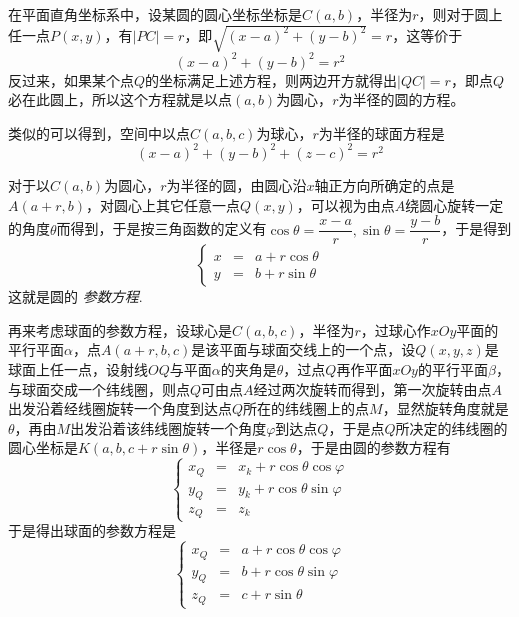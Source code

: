 在平面直角坐标系中，设某圆的圆心坐标坐标是$C(a,b)$，半径为$r$，则对于圆上任一点$P(x,y)$，有$|PC|=r$，即$\sqrt{(x-a)^2+(y-b)^2}=r$，这等价于
\[ (x-a)^2+(y-b)^2=r^2 \]
反过来，如果某个点$Q$的坐标满足上述方程，则两边开方就得出$|QC|=r$，即点$Q$必在此圆上，所以这个方程就是以点$(a,b)$为圆心，$r$为半径的圆的方程。

类似的可以得到，空间中以点$C(a,b,c)$为球心，$r$为半径的球面方程是
\[ (x-a)^2+(y-b)^2+(z-c)^2=r^2 \]

对于以$C(a,b)$为圆心，$r$为半径的圆，由圆心沿$x$轴正方向所确定的点是$A(a+r,b)$，对圆心上其它任意一点$Q(x,y)$，可以视为由点$A$绕圆心旋转一定的角度$\theta$而得到，于是按三角函数的定义有$\cos{\theta}=\dfrac{x-a}{r},\sin{\theta}=\dfrac{y-b}{r}$，于是得到
\[ \left\{
    \begin{array}{lll}
      x & = & a + r \cos{\theta} \\
      y & = & b + r \sin{\theta} 
    \end{array}
  \right. \]
这就是圆的 \emph{参数方程}.

再来考虑球面的参数方程，设球心是$C(a,b,c)$，半径为$r$，过球心作$xOy$平面的平行平面$\alpha$，点$A(a+r,b,c)$是该平面与球面交线上的一个点，设$Q(x,y,z)$是球面上任一点，设射线$OQ$与平面$\alpha$的夹角是$\theta$，过点$Q$再作平面$xOy$的平行平面$\beta$，与球面交成一个纬线圈，则点$Q$可由点$A$经过两次旋转而得到，第一次旋转由点$A$出发沿着经线圈旋转一个角度到达点$Q$所在的纬线圈上的点$M$，显然旋转角度就是$\theta$，再由$M$出发沿着该纬线圈旋转一个角度$\varphi$到达点$Q$，于是点$Q$所决定的纬线圈的圆心坐标是$K(a,b,c+r\sin{\theta})$，半径是$r\cos{\theta}$，于是由圆的参数方程有
\[ \left\{
    \begin{array}{lll}
      x_Q & = & x_k + r \cos{\theta}\cos{\varphi}  \\
      y_Q & = & y_k + r \cos{\theta}\sin{\varphi} \\
      z_Q & = & z_k
    \end{array}
  \right. \]
于是得出球面的参数方程是
\[ \left\{
    \begin{array}{lll}
      x_Q & = & a + r \cos{\theta}\cos{\varphi}  \\
      y_Q & = & b + r \cos{\theta}\sin{\varphi} \\
      z_Q & = & c+r\sin{\theta}
    \end{array}
  \right. \]



